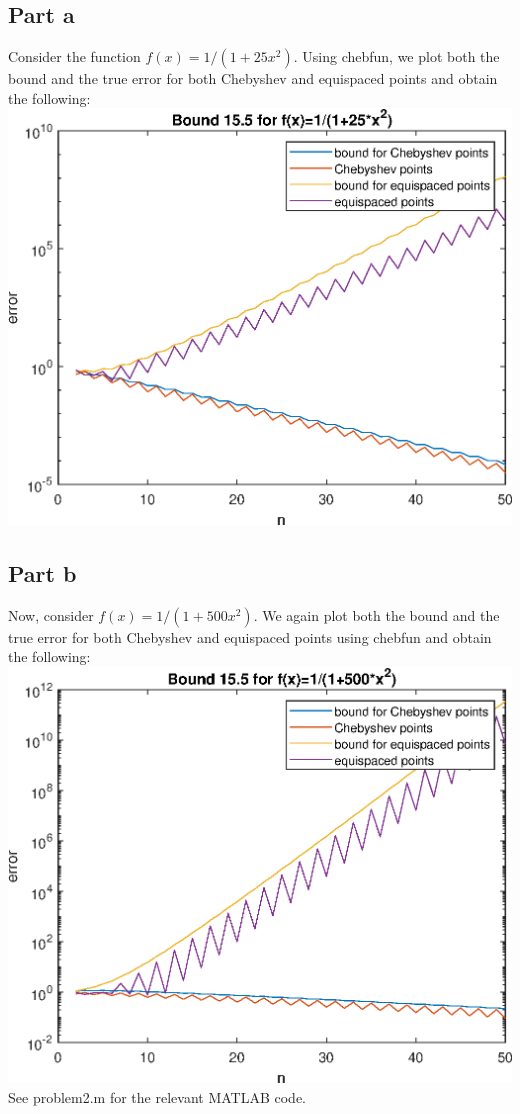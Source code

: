 \documentclass{article}
\begin{document}
\subsection{Part a}
Consider the function $f(x)=1/(1+25x^2)$. Using chebfun, we plot both the bound and the true error for both Chebyshev and equispaced points and obtain the following:\\
\includegraphics[]{2a.eps}

\subsection{Part b}
Now, consider $f(x)=1/(1+500x^2)$. We again plot both the bound and the true error for both Chebyshev and equispaced points using chebfun and obtain the following: \\
\includegraphics[]{2b.eps}\\
See problem2.m for the relevant MATLAB code.  
\end{document}
